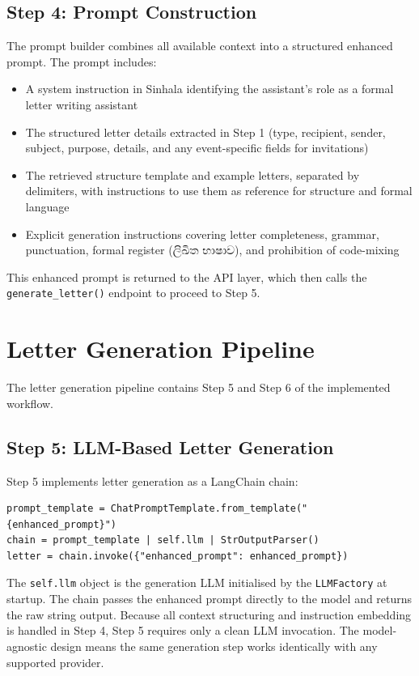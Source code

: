\documentclass[12pt]{uomthesis}
\begin{document}
\subsection{Step 4: Prompt Construction}

The prompt builder combines all available context into a structured enhanced prompt. The prompt includes:
\begin{itemize}
    \item A system instruction in Sinhala identifying the assistant's role as a formal letter writing assistant
    \item The structured letter details extracted in Step 1 (type, recipient, sender, subject, purpose, details, and any event-specific fields for invitations)
    \item The retrieved structure template and example letters, separated by delimiters, with instructions to use them as reference for structure and formal language
    \item Explicit generation instructions covering letter completeness, grammar, punctuation, formal register (ලිඛිත භාෂාව), and prohibition of code-mixing
\end{itemize}

This enhanced prompt is returned to the API layer, which then calls the \texttt{generate\_letter()} endpoint to proceed to Step 5.

\section{Letter Generation Pipeline}

The letter generation pipeline contains Step 5 and Step 6 of the implemented workflow.

\subsection{Step 5: LLM-Based Letter Generation}

Step 5 implements letter generation as a LangChain chain:

\begin{verbatim}
prompt_template = ChatPromptTemplate.from_template("{enhanced_prompt}")
chain = prompt_template | self.llm | StrOutputParser()
letter = chain.invoke({"enhanced_prompt": enhanced_prompt})
\end{verbatim}

The \texttt{self.llm} object is the generation LLM initialised by the \texttt{LLMFactory} at startup. The chain passes the enhanced prompt directly to the model and returns the raw string output. Because all context structuring and instruction embedding is handled in Step 4, Step 5 requires only a clean LLM invocation. The model-agnostic design means the same generation step works identically with any supported provider.
\end{document}
